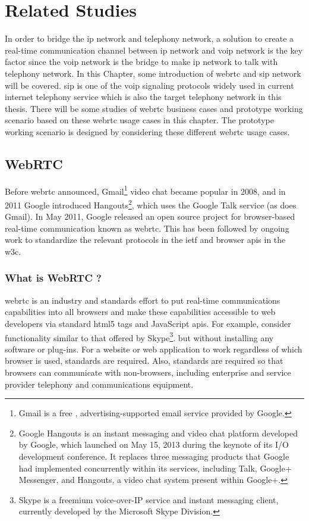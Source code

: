 \chapter{Related Studies}
\label{chp:pre_study}

\noindent In order to bridge the \gls{ip} network and telephony network, a solution to create a real-time communication channel between \gls{ip} network and \gls{voip} network is the key factor since the \gls{voip} network is the bridge to make \gls{ip} network to talk with telephony network. In this Chapter, some introduction of \gls{webrtc} and \gls{sip} network will be covered. \gls{sip} is one of the \gls{voip} signaling protocols widely used in current internet telephony service which is also the target telephony network in this thesis. There will be some studies of \gls{webrtc} business cases and prototype working scenario based on these \gls{webrtc} usage cases in this chapter. The prototype working scenario is designed by considering these different \gls{webrtc} usage cases.

\section{WebRTC}

\noindent Before \gls{webrtc} announced, Gmail\footnote{Gmail is a free , advertising-supported email service provided by Google.} video chat became popular in 2008, and in 2011 Google introduced Hangouts\footnote{Google Hangouts is an instant messaging and video chat platform developed by Google, which launched on May 15, 2013 during the keynote of its I/O development conference. It replaces three messaging products that Google had implemented concurrently within its services, including Talk, Google+ Messenger, and Hangouts, a video chat system present within Google+.}, which uses the Google Talk service (as does Gmail). In May 2011, Google released an open source project for browser-based real-time communication known as \gls{webrtc}. This has been followed by ongoing work to standardize the relevant protocols in the \gls{ietf} and browser \gls{api}s in the \gls{w3c}.

\subsection{What is WebRTC ?}

\noindent \gls{webrtc} is an industry and standards effort to put real-time communications capabilities into all browsers and make these capabilities accessible to web developers via standard \gls{html5} tags and JavaScript \gls{api}s. For example, consider functionality similar to that offered by Skype\footnote{Skype is a freemium voice-over-IP service and instant messaging client, currently developed by the Microsoft Skype Division.\cite{wiki:skype}}. but without installing any software or plug-ins. For a website or web application to work regardless of which browser is used, standards are required. Also, standards are required so that browsers can communicate with non-browsers, including enterprise and service provider telephony and communications equipment\cite{inbook:rtc-intro}.


